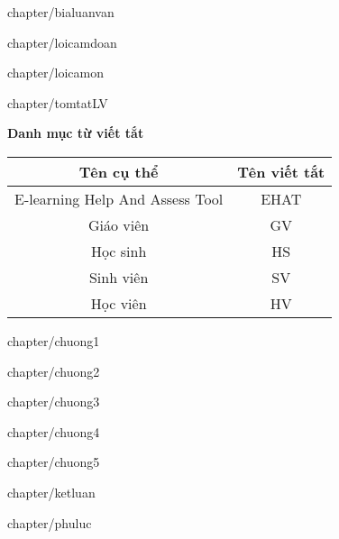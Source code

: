 \documentclass[12pt, a4paper, reqno, oneside]{report}
\begin{document}
	\makeatletter
	\renewcommand{\ps@myheadings}{
		\renewcommand{\@oddhead}{\textsf{Luận văn tốt nghiệp - công nghệ thông tin}\hfil\textrm{\thepage}}
		\renewcommand{\@oddfoot}{\textsf{Phan Minh Cường, Khoa Khoa học \& Kỹ thuật máy tính}\hfil}
	}
	
	\newpage
	 {chapter/bialuanvan}
	
	
	\newpage
	 {chapter/loicamdoan}
	
	\newpage
	 {chapter/loicamon}
	
	\newpage
	 {chapter/tomtatLV}
	
	\newpage
	\tableofcontents
	
	\newpage
	{\huge\bf Danh mục từ viết tắt} 
	
	\begin{center}
		\begin{table}[!htp]
			\centering
			\begin{tabular}{|c|c|}
				\hline 
				Tên cụ thể & Tên viết tắt \\ 
				\hline 
				E-learning Help And Assess Tool & EHAT \\ 
				\hline 
				Giáo viên & GV \\ 
				\hline 
				Học sinh & HS \\ 
				\hline 
				Sinh viên & SV \\ 
				\hline 
				Học viên & HV \\ 
				\hline 
			\end{tabular}
			\label{bang}
		\end{table}
	\end{center}
	
	\newpage
	\listoftables
	
	\newpage
	\listoffigures

	\newpage
	 {chapter/chuong1}
	
	\newpage
	 {chapter/chuong2}
	
	\newpage
	 {chapter/chuong3}
	
	\newpage
	 {chapter/chuong4}
	
	\newpage
	 {chapter/chuong5}
	
	\newpage
	 {chapter/ketluan}
	
	\newpage
	 {chapter/phuluc}
	
	\printbibliography
\end{document}
